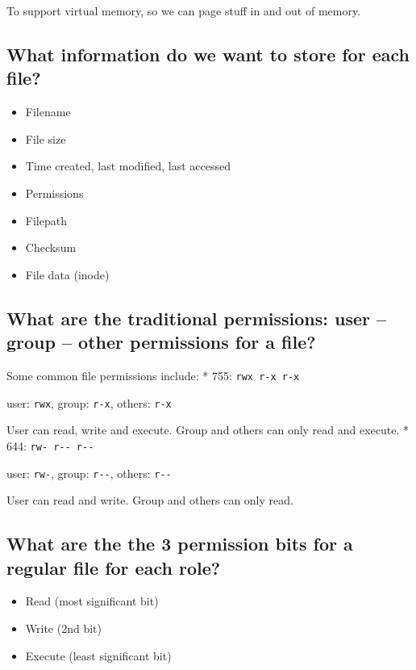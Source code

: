 To support virtual memory, so we can page stuff in and out of memory.

\subsection{What information do we want to store for each
file?}\label{what-information-do-we-want-to-store-for-each-file}

\begin{itemize}
\tightlist
\item
  Filename
\item
  File size
\item
  Time created, last modified, last accessed
\item
  Permissions
\item
  Filepath
\item
  Checksum
\item
  File data (inode)
\end{itemize}

\subsection{What are the traditional permissions: user -- group -- other
permissions for a
file?}\label{what-are-the-traditional-permissions-user-group-other-permissions-for-a-file}

Some common file permissions include: * 755: \texttt{rwx\ r-x\ r-x}

user: \texttt{rwx}, group: \texttt{r-x}, others: \texttt{r-x}

User can read, write and execute. Group and others can only read and
execute. * 644: \texttt{rw-\ r-\/-\ r-\/-}

user: \texttt{rw-}, group: \texttt{r-\/-}, others: \texttt{r-\/-}

User can read and write. Group and others can only read.

\subsection{What are the the 3 permission bits for a regular file for
each
role?}\label{what-are-the-the-3-permission-bits-for-a-regular-file-for-each-role}

\begin{itemize}
\tightlist
\item
  Read (most significant bit)\\
\item
  Write (2nd bit)\\
\item
  Execute (least significant bit)
\end{itemize}

